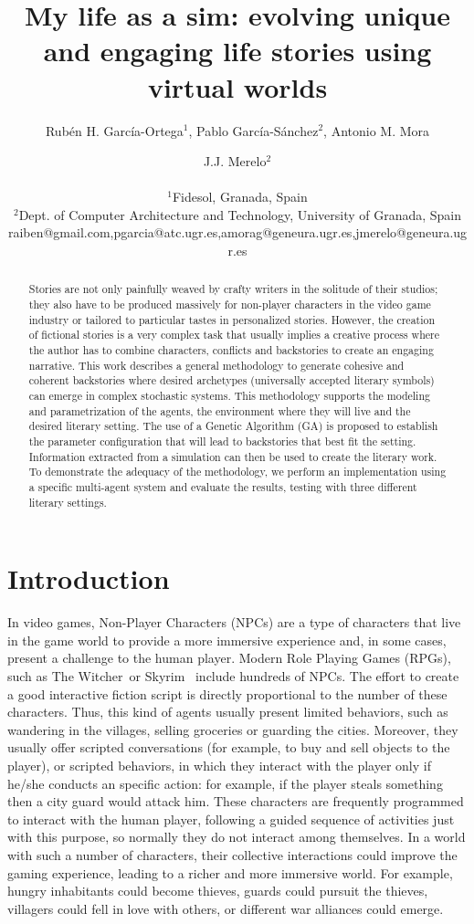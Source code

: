 \documentclass[letterpaper]{article}
\title{My life as a sim: evolving unique and engaging life stories using virtual worlds}
\author{Rub\'en H. Garc\'ia-Ortega$^{1}$, Pablo Garc\'ia-S\'anchez$^{2}$, Antonio M. Mora \and J.J. Merelo$^2$ \\
\mbox{}\\
$^1$Fidesol, Granada, Spain \\
$^2$Dept. of Computer Architecture and Technology, University of Granada, Spain \\
raiben@gmail.com,pgarcia@atc.ugr.es,amorag@geneura.ugr.es,jmerelo@geneura.ugr.es}
\begin{document}
\maketitle

\begin{abstract}
Stories are not only painfully weaved by crafty writers in the
solitude of their studios; they also have to be produced massively for
non-player characters in the video game industry or tailored to
particular tastes in personalized stories. However, the creation of
fictional stories is a very complex task that usually implies a
creative process where the author has to combine characters, 
conflicts and backstories to create an engaging narrative.
This work describes a general methodology to generate cohesive and coherent
backstories where desired archetypes (universally accepted literary symbols) can emerge in complex stochastic systems.
This methodology supports the modeling and parametrization of the agents, the environment where they will live and the desired literary setting. The use of a Genetic Algorithm (GA) is proposed to establish the parameter configuration that will lead to backstories that best fit the setting. Information extracted from a simulation can then be used to create the literary work.
To demonstrate the adequacy of the methodology, we perform an implementation using a specific multi-agent system and evaluate the results, testing with three different literary settings.
\end{abstract}


\section{Introduction}

In video games, Non-Player Characters (NPCs)  are a type of characters
that live in the game world to provide a more immersive
experience and, in some cases, present a challenge to the human player. Modern  Role Playing Games (RPGs), such as The
Witcher\texttrademark~or Skyrim\texttrademark~ include hundreds of NPCs. The effort to create a good interactive fiction script is directly proportional to the number of these characters. Thus, this kind of agents usually present limited behaviors, such as wandering in the villages, selling groceries or guarding the cities. Moreover, they usually offer scripted conversations (for example, to buy and sell objects to the player), or scripted behaviors, in which they interact with the player only if he/she conducts an specific action: for example, if the player steals something then a city guard would attack him. These characters are frequently programmed to interact with the human player, following a guided sequence of activities just with this purpose, so normally they do not interact among themselves. In a world with such a number of characters, their collective interactions could improve the gaming experience, leading to a richer and more immersive world. For example, hungry inhabitants could become thieves, guards could pursuit the thieves, villagers could fell in love with others, or different war alliances could emerge.
\end{document}
